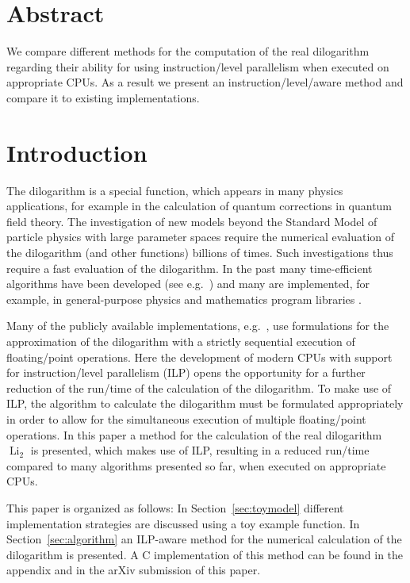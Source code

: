 \documentclass[10pt,DIV16,twocolumn,numbers=noenddot]{scrartcl}
\title{\mytitle}
\author{\myauthor}
\affil{Fachbereich Energie und Biotechnologie, Hochschule Flensburg,\\ Kanzleistra{\ss}e 91--93, 24943 Flensburg, Germany}
\date{\today}
\newcommand{\Li}{\operatorname{Li}_2}
\newcommand{\secref}[1]{Section~\ref{#1}}
\begin{document}
\maketitle

\section*{Abstract}

We compare different methods for the computation of the real
dilogarithm regarding their ability for using instruction\-/level
parallelism when executed on appropriate CPUs.  As a result we present
an instruction\-/level\-/aware method and compare it to existing
implementations.

\section{Introduction}

The dilogarithm \cite{lewin} is a special function, which appears in
many physics applications, for example in the calculation of quantum
corrections in quantum field theory.  The investigation of new models
beyond the Standard Model of particle physics with large parameter
spaces require the numerical evaluation of the dilogarithm (and other
functions) billions of times.  Such investigations thus require a fast
evaluation of the dilogarithm.  In the past many time-efficient
algorithms have been developed (see e.g.\
\cite{koelbigDilog,ginsberg,morris,luke}) and many are implemented,
for example, in general-purpose physics and mathematics program
libraries \cite{root,gsl,cephes}.

Many of the publicly available implementations, e.g.\ \cite{root,gsl},
use formulations for the approximation of the dilogarithm with a
strictly sequential execution of floating\-/point operations.  Here
the development of modern CPUs with support for instruction\-/level
parallelism (ILP) opens the opportunity for a further reduction of the
run\-/time of the calculation of the dilogarithm.  To make use of ILP,
the algorithm to calculate the dilogarithm must be formulated
appropriately in order to allow for the simultaneous execution of
multiple floating\-/point operations.  In this paper a method for the
calculation of the real dilogarithm $\Li$ is presented, which makes
use of ILP, resulting in a reduced run\-/time compared to many
algorithms presented so far, when executed on appropriate CPUs.

This paper is organized as follows: In \secref{sec:toymodel} different
implementation strategies are discussed using a toy example function.
In \secref{sec:algorithm} an ILP-aware method for the numerical
calculation of the dilogarithm is presented.  A C implementation of
this method can be found in the appendix and in the arXiv submission
of this paper.
\end{document}
